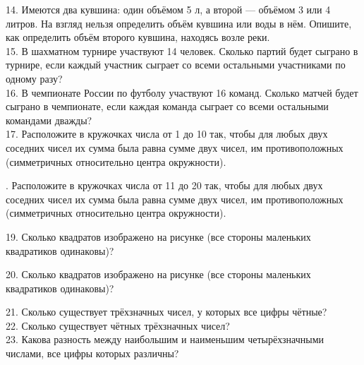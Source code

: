 14. Имеются два кувшина: один объёмом 5 л, а второй --- объёмом 3 или 4 литров. На взгляд нельзя определить объём кувшина или воды в нём. Опишите, как определить объём второго кувшина, находясь возле реки.\\
15. В шахматном турнире участвуют 14 человек. Сколько партий будет сыграно в турнире, если каждый участник сыграет со всеми остальными участниками по одному разу?\\
16. В чемпионате России по футболу участвуют 16 команд. Сколько матчей будет сыграно в чемпионате, если каждая команда сыграет со всеми остальными командами дважды?\\
17. Расположите в кружочках числа от 1 до 10 так, чтобы для любых двух соседних чисел их сумма была равна сумме двух чисел, им противоположных (симметричных относительно центра окружности).
\begin{center}
\begin{figure}[ht!]
\end{figure}
\end{center}
\newpage
{}. Расположите в кружочках числа от 11 до 20 так, чтобы для любых двух соседних чисел их сумма была равна сумме двух чисел, им противоположных (симметричных относительно центра окружности).
\begin{center}
\begin{figure}[ht!]
\end{figure}
\end{center}
19. Сколько квадратов изображено на рисунке (все стороны маленьких квадратиков одинаковы)?
\begin{center}
\begin{figure}[ht!]
\end{figure}
\end{center}
20. Сколько квадратов изображено на рисунке (все стороны маленьких квадратиков одинаковы)?
\begin{center}
\begin{figure}[ht!]
\end{figure}
\end{center}
21. Сколько существует трёхзначных чисел, у которых все цифры чётные?\\
22. Сколько существует чётных трёхзначных чисел?\\
23. Какова разность между наибольшим и наименьшим четырёхзначными числами, все цифры которых различны?\\
